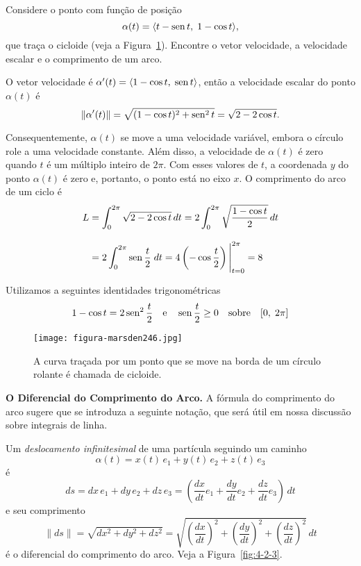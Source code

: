 \bigskip
\begin{exc}
Considere o ponto com função de posição
\begin{equation*}
\alpha(t) =\langle t-\operatorname{sen} t,\; 1-\cos t \rangle,
\end{equation*}
que traça o cicloide (veja a Figura~\ref{fig:2-4-6}). Encontre o vetor velocidade, a velocidade escalar e o comprimento de um arco.
\end{exc}

\solo
O vetor velocidade é \(\alpha'(t) =\langle 1- \cos t,\; \operatorname{sen} t\rangle \), então a velocidade escalar do ponto \(\alpha(t)\) é
\begin{equation*}
\|\alpha'(t)\| = \sqrt{(1-\cos t)^{2} + \operatorname{sen}^{2} t} = \sqrt{2 - 2 \cos t}.
\end{equation*}

Consequentemente, \(\alpha(t)\) se move a uma velocidade variável, embora o círculo role a uma velocidade constante.
Além disso, a velocidade de \(\alpha(t)\) é zero quando \(t\) é um múltiplo inteiro de \(2\pi\). Com esses valores de
\(t\), a coordenada \(y\) do ponto \(\alpha(t)\) é zero e, portanto, o ponto está no eixo \(x\). O comprimento do
arco de um ciclo é
\begin{align*}
  L& =\int_{0}^{2\pi}\sqrt{2-2\cos t}\,dt=2\int_{0}^{2\pi}\sqrt{\frac{1-\cos t}{2}}\, dt \\[2ex]
   &= 2\int_{0}^{2\pi}\operatorname{sen} \frac{t}{2}\; dt=4\left(-\cos \frac{t}{2}\right)\Bigg\vert_{t=0}^{2\pi}=8
\end{align*}

Utilizamos a seguintes identidades trigonométricas
\begin{equation*}
1-\cos t=2\operatorname{sen}^{2} \frac{t}{2}\quad \text{e} \quad  \operatorname{sen} \frac{t}{2} \geq 0 \quad  \text{sobre}\quad [0,\; 2\pi]
\end{equation*}

\begin{figure}[H]
  \centering
  \texttt{[image: figura-marsden246.jpg]}
  \caption{A curva traçada por um ponto que se move na borda de um círculo rolante é chamada de cicloide.}
  \label{fig:2-4-6}
\end{figure}

\bigskip
\noindent\textbf{O Diferencial do Comprimento do Arco.}
A fórmula do comprimento do arco sugere que se introduza a seguinte notação, que será útil em nossa discussão sobre integrais de linha.

Um \emph{deslocamento infinitesimal} de uma partícula seguindo um caminho
\begin{equation*}
\alpha(t) = x(t)\,e_{1} + y(t)\,e_{2} + z(t)\, e_{3}
\end{equation*}
é
\begin{equation*}
ds=dx\,e_{1}+dy\,e_{2}+dz\,e_{3}=\left(\frac{dx}{dt}e_{1}+\frac{dy}{dt}e_{2}+\frac{dz}{dt}e_{3} \right)\,dt
\end{equation*}
e seu comprimento
\begin{equation*}
\|ds\|=\sqrt{dx^{2}+dy^{2}+dz^{2}}=\sqrt{\left( \frac{dx}{dt}\right)^{2}+\left(\frac{dy}{dt}
\right)^{2}+\left(\frac{dz}{dt} \right)^{2}}\,dt
\end{equation*}
é o diferencial do comprimento do arco. Veja a Figura~\ref{fig:4-2-3}.

